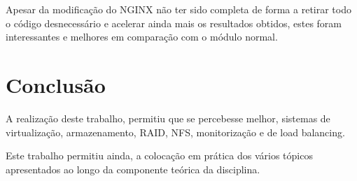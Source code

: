 \documentclass[pdftex,12pt,a4paper]{report}
\begin{document}
\begin{table}[!htb]
\centering
\centering
\caption{Comparação entre testes}
\label{my-label}
\end{table}

Apesar da modificação do NGINX não ter sido completa de forma a retirar todo o código desnecessário e acelerar ainda mais os resultados obtidos, estes foram interessantes e melhores em comparação com o módulo normal.

\newpage

\section{Conclusão}

A realização deste trabalho, permitiu que se percebesse melhor, sistemas de virtualização,  armazenamento, RAID, NFS,  monitorização e de load balancing.

Este trabalho permitiu ainda, a colocação em prática dos vários tópicos apresentados ao longo da componente teórica da disciplina. 
\end{document}
